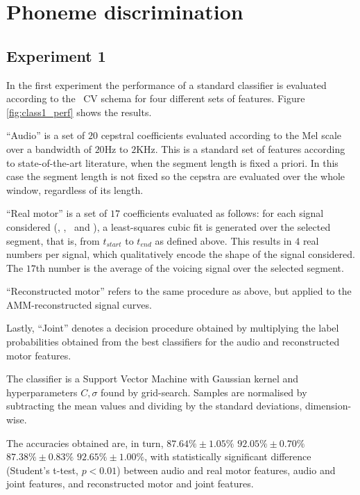 \section{Phoneme discrimination}
\label{sec:class}

\subsection{Experiment 1}
\label{subsec:exp1}

In the first experiment the performance of a standard classifier is evaluated
according to the \overall\ CV schema for four different sets of features.
Figure \ref{fig:class1_perf} shows the results.

``Audio'' is a set of $20$ cepstral coefficients evaluated according to the
Mel scale over a bandwidth of $20$Hz to $2$KHz. This is a standard set of features
according to state-of-the-art literature, when the segment
length is fixed a priori. In this case the segment length is not fixed so the
cepstra are evaluated over the whole window, regardless of its length.

``Real motor'' is a set of $17$ coefficients evaluated as follows: for each
signal considered (\vlio, \alio, \vttu\ and \attu), a least-squares cubic fit
is generated over the selected segment, that is, from $t_{start}$ to $t_{end}$
as defined above. This results in $4$ real numbers
per signal, which qualitatively encode the shape of the signal considered. The
$17$th number is the average of the voicing signal over the selected segment.

``Reconstructed motor'' refers to the same procedure as above, but applied
to the AMM-reconstructed signal curves.

Lastly, ``Joint'' denotes a decision procedure obtained by multiplying the
label probabilities obtained from the best classifiers for the audio and
reconstructed motor features.

The classifier is a Support Vector Machine \cite{BGV92} with Gaussian kernel
and hyperparameters $C, \sigma$ found by grid-search. Samples are normalised
by subtracting the mean values and dividing by the standard deviations,
dimension-wise.

The accuracies obtained are, in turn,
$87.64\% \pm 1.05\%$
$92.05\% \pm 0.70\%$
$87.38\% \pm 0.83\%$
$92.65\% \pm 1.00\%$, with statistically significant difference (Student's t-test,
$p<0.01$) between audio and real motor features, audio and joint features, and
reconstructed motor and joint features.

